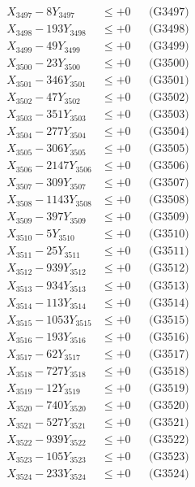 \documentclass[a4paper,10pt]{article}
\begin{document}
{\begin{align}
X_{3497} - 8Y_{3497} &\leq +0 && \text{(G3497)} \\
X_{3498} - 193Y_{3498} &\leq +0 && \text{(G3498)} \\
X_{3499} - 49Y_{3499} &\leq +0 && \text{(G3499)} \\
X_{3500} - 23Y_{3500} &\leq +0 && \text{(G3500)} \\
\allowbreak
X_{3501} - 346Y_{3501} &\leq +0 && \text{(G3501)} \\
X_{3502} - 47Y_{3502} &\leq +0 && \text{(G3502)} \\
X_{3503} - 351Y_{3503} &\leq +0 && \text{(G3503)} \\
X_{3504} - 277Y_{3504} &\leq +0 && \text{(G3504)} \\
X_{3505} - 306Y_{3505} &\leq +0 && \text{(G3505)} \\
X_{3506} - 2147Y_{3506} &\leq +0 && \text{(G3506)} \\
X_{3507} - 309Y_{3507} &\leq +0 && \text{(G3507)} \\
X_{3508} - 1143Y_{3508} &\leq +0 && \text{(G3508)} \\
X_{3509} - 397Y_{3509} &\leq +0 && \text{(G3509)} \\
X_{3510} - 5Y_{3510} &\leq +0 && \text{(G3510)} \\
\allowbreak
X_{3511} - 25Y_{3511} &\leq +0 && \text{(G3511)} \\
X_{3512} - 939Y_{3512} &\leq +0 && \text{(G3512)} \\
X_{3513} - 934Y_{3513} &\leq +0 && \text{(G3513)} \\
X_{3514} - 113Y_{3514} &\leq +0 && \text{(G3514)} \\
X_{3515} - 1053Y_{3515} &\leq +0 && \text{(G3515)} \\
X_{3516} - 193Y_{3516} &\leq +0 && \text{(G3516)} \\
X_{3517} - 62Y_{3517} &\leq +0 && \text{(G3517)} \\
X_{3518} - 727Y_{3518} &\leq +0 && \text{(G3518)} \\
X_{3519} - 12Y_{3519} &\leq +0 && \text{(G3519)} \\
X_{3520} - 740Y_{3520} &\leq +0 && \text{(G3520)} \\
\allowbreak
X_{3521} - 527Y_{3521} &\leq +0 && \text{(G3521)} \\
X_{3522} - 939Y_{3522} &\leq +0 && \text{(G3522)} \\
X_{3523} - 105Y_{3523} &\leq +0 && \text{(G3523)} \\
X_{3524} - 233Y_{3524} &\leq +0 && \text{(G3524)} \\

\end{align}}
\end{document}
